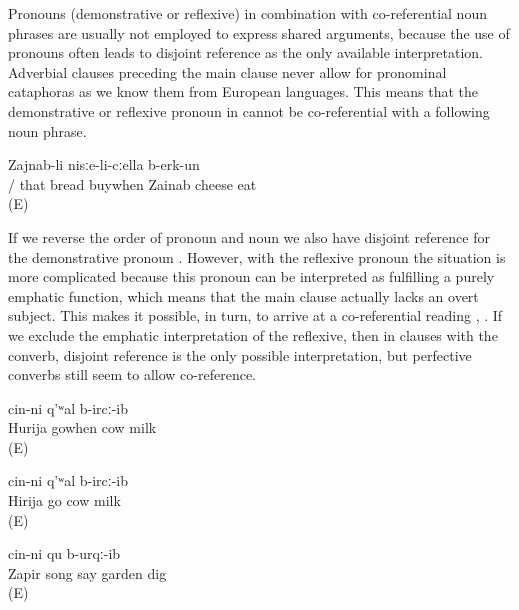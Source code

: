 Pronouns (demonstrative or reflexive) in combination with co-referential noun phrases are usually not employed to express shared arguments, because the use of pronouns often leads to disjoint reference as the only available interpretation. Adverbial clauses preceding the main clause never allow for pronominal cataphoras as we know them from European languages. This means that the demonstrative or reflexive pronoun in  cannot be co-referential with a following noun phrase.
%
\begin{exe}
	\ex	\label{ex:‎When s/he bought bread, Zainab ate (it) with cheese}
	\gll	[cin-ni	/	it-i-l	t'ult'	asː-ib=qːel]	Zajnab-li	nisːe-li-cːella	b-erk-un\\
			/	that	bread	buywhen	Zainab	cheese	eat\\
	\glt	{} (E)
\end{exe}

If we reverse the order of pronoun and noun we also have disjoint reference for the demonstrative pronoun . However, with the reflexive pronoun the situation is more complicated because this pronoun can be interpreted as fulfilling a purely emphatic function, which means that the main clause actually lacks an overt subject. This makes it possible, in turn, to arrive at a co-referential reading , . If we exclude the emphatic interpretation of the reflexive, then in clauses with the  converb, disjoint reference is the only possible interpretation, but perfective converbs still seem to allow co-reference. 
%
\begin{exe}
	\ex	\label{ex:‎When Hurija came, s/he milked the cow1}
	\gll	[ħuˁrija	sa-r-eʁ-ib=qːel]	cin-ni	q'ʷal	b-ircː-ib\\
		Hurija	gowhen		cow	milk\\
	\glt	{} (E)

	\ex	\label{ex:‎When Hurija came, s/he milked the cow2}
	\gll	[ħuˁrija	sa-r-eʁ-ib-le]	cin-ni	q'ʷal	b-ircː-ib\\
		Hirija	go		cow	milk\\
	\glt	{} (E)

	\ex	\label{ex:‎While Zapir was singing a song while he dug the field}
		cin-ni	qu	b-urqː-ib\\
		Zapir	song	say		garden	dig\\
	\glt	{} (E)
\end{exe}

